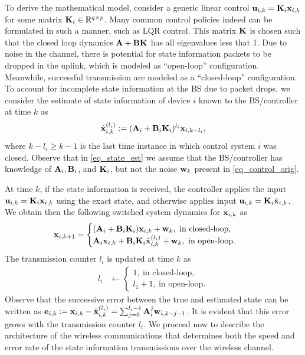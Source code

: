To derive the mathematical model, consider a generic linear control $ {\mathbf u}_{i,k} = {\mathbf K}_i {\mathbf x}_{i,k}$ for some matrix ${\mathbf K}_i \in {\mathbb R}^{q \times p}$. Many common control policies indeed can be formulated in such a manner, such as LQR control. This matrix ${\mathbf K}$ is chosen such that the closed loop dynamics ${\mathbf A} + {\mathbf B} {\mathbf K}$ has all eigenvalues less that 1. Due to noise in the channel, there is potential for state information packets  to be dropped in the uplink, which is modeled as ``open-loop'' configuration. Meanwhile, successful transmission are modeled as a ``closed-loop'' configuration. To account for incomplete state information at the BS due to packet drops, we consider the estimate of state information of device $i$ known to the BS/controller at time $k$ as
%
\begin{align}\label{eq_state_est}
{\hat{\ensuremath{\mathbf x}} }^{(l_i)}_{i,k} :=({\mathbf A}_i + {\mathbf B}_i{\mathbf K}_i)^{l_i} {\mathbf x}_{i,k-l_i},
\end{align}
%
where $k-l_i \geq k-1$ is the last time instance in which control system $i$ was closed. Observe that in \eqref{eq_state_est} we assume that the BS/controller has knowledge of ${\mathbf A}_i, {\mathbf B}_i$, and ${\mathbf K}_i$, but not the noise ${\mathbf w}_k$ present in \eqref{eq_control_orig}. 

At time $k$, if the state information is received, the controller applies the input ${\mathbf u}_{i,k} = {\mathbf K}_i {\mathbf x}_{i,k}$ using the exact state, and otherwise applies input ${\mathbf u}_{i,k} = {\mathbf K}_i {\hat{\mathbf x} }_{i,k}$. We obtain then the following switched system dynamics for ${\mathbf x}_{i,k}$ as
%
\begin{align}\label{eq_control_switch}
{\ensuremath{\mathbf x}}_{i,k+1} &= \begin{cases}
({\mathbf A}_i + {\mathbf B}_i {\mathbf K}_i) {\mathbf x}_{i,k} + {\mathbf w}_k, \ \text{in closed-loop}, \\
{\mathbf A}_i {\mathbf x}_{i,k} + {\mathbf B}_i{\mathbf K}_i{\hat{\mathbf x} }^{(l_i)}_{i,k} + {\mathbf w}_k, \ \text{in open-loop}.
\end{cases}
\end{align}
%
The transmission counter $l_i$ is updated at time $k$ as
%
\begin{align}
l_i &\leftarrow \begin{cases}
1, \ \text{in closed-loop}, \\
l_1 + 1, \ \text{in open-loop}.
\end{cases} \label{eq_time_switch}
\end{align}
%
Observe that the successive error between the true and estimated state can be written as
${\mathbf e}_{i,k} := {\mathbf x}_{i,k} - {\hat{\mathbf x} }^{(l_i)}_{i,k} = \sum_{j=0}^{l_i-1}{\mathbf A}_i^{j} {\mathbf w}_{i,k-j-1}$. It is evident that this error grows with the transmission counter $l_i$. We proceed now to describe the architecture of the wireless communications that determines both the speed and error rate of the state information transmissions over the wireless channel.


